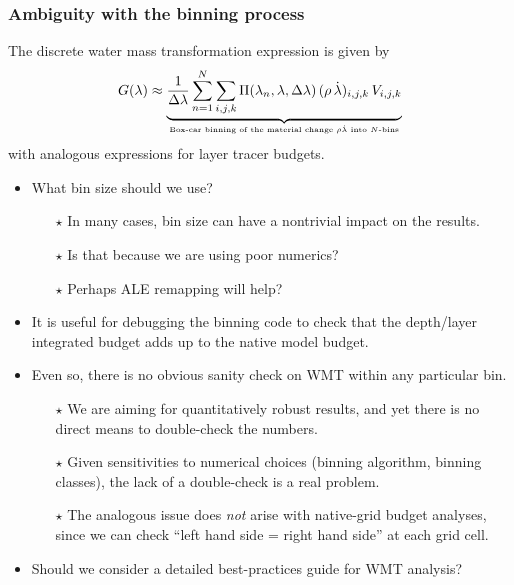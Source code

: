 \documentclass[10pt]{beamer}
\begin{document}
\begin{frame}
  \frametitle{Ambiguity with the binning process}

  The discrete water mass transformation expression is given by
\begin{equation}
G(\lambda) 
\approx 
\underbrace{
  \frac{1}{\Delta \lambda} \sum_{n=1}^{N} \sum_{i,j,k}
  \Pi(\lambda_{n},\lambda,\Delta \lambda)
  \, (\rho \, \dot{\lambda})_{i,j,k} \, V_{i,j,k}
}_{\mbox{\tiny Box-car binning of the material change $\rho \dot{\lambda}$  into $N$-bins}}
\label{eq:wmt-discrete-math}
\end{equation}
 with analogous expressions for layer tracer budgets.  

\begin{exampleblock}{}
\begin{itemize}
\item What bin size should we use?  
   \begin{itemize} \footnotesize 
   \item[$\star$] In many cases, bin size can have a nontrivial impact on the results.
   \item[$\star$] Is that because we are using poor numerics?  
   \item[$\star$] Perhaps ALE remapping will help? 
\end{itemize}

\item It is useful for debugging the binning code to check that the
  depth/layer integrated budget adds up to the native model
  budget. 

\item Even so, there is no obvious sanity check on WMT
     within any particular bin.
     \begin{itemize}\footnotesize
     \item[$\star$] We are aiming for quantitatively robust
       results, and yet there is no direct means to double-check
       the numbers. 
     \item[$\star$] Given sensitivities to numerical choices (binning
       algorithm, binning classes), the lack of a double-check is a
       real problem.
     \item[$\star$] The analogous issue does {\it not} arise with
       native-grid budget analyses, since we can check ``left hand
       side = right hand side'' at each grid cell.  
    \end{itemize}

  \item Should we consider a detailed best-practices guide for WMT analysis?

\end{itemize}
\end{exampleblock}{}


\end{frame}
\end{document}
